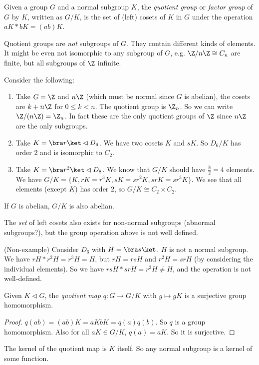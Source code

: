 \documentclass[a4pape]{article}
\begin{document}
\begin{defi}
  Given a group $G$ and a normal subgroup $K$, the \emph{quotient group} or \emph{factor group} of $G$ by $K$, written as $G/K$, is the set of (left) cosets of $K$ in $G$ under the operation $aK*bK = (ab)K$.
\end{defi}

\note Quotient groups are \emph{not} subgroups of $G$. They contain different kinds of elements. It might be even not isomorphic to any subgroup of $G$, e.g. $\Z/n\Z \cong C_n$ are finite, but all subgroups of $\Z$ infinite.

\begin{eg}
  Consider the following:
  \begin{enumerate}
  \item Take $G = \Z$ and $n\Z$ (which must be normal since $G$ is abelian), the cosets are $k + n\Z$ for $0 \leq k < n$. The quotient group is $\Z_n$. So we can write $\Z/(n\Z) = \Z_n$. In fact these are the only quotient groups of $\Z$ since $n\Z$ are the only subgroups.
  \item Take $K = \bra r\ket \lhd D_6$. We have two cosets $K$ and $sK$. So $D_6/K$ has order 2 and is isomorphic to $C_2$.
  \item Take $K = \bra r^2\ket \lhd D_8$. We know that $G/K$ should have $\frac{8}{2} = 4$ elements. We have $G/K = \{ K, rK = r^3 K, sK = sr^2K, srK = sr^3K\}$. We see that all elements (except $K$) has order $2$, so $G/K\cong C_2\times C_2$.
  \end{enumerate}
\end{eg}
\note If $G$ is abelian, $G/K$ is also abelian.

\note The \emph{set} of left cosets also exists for non-normal subgroups (abnormal subgroups?), but the group operation above is not well defined.

\begin{eg}
  (Non-example) Consider $D_6$ with $H = \bra s\ket$. $H$ is not a normal subgroup. We have $rH * r^2 H = r^3 H = H$, but $rH = rsH$ and $r^2H = srH$ (by considering the individual elements). So we have $rsH * srH = r^2 H\not= H$, and the operation is not well-defined.
\end{eg}

\begin{lemma}
  Given $K\lhd G$, the \emph{quotient map} $q: G\rightarrow G/K$ with $g\mapsto gK$ is a surjective group homomorphism.
\end{lemma}

\begin{proof}
  $q(ab) = (ab)K = aKbK = q(a)q(b)$. So $q$ is a group homomorphism. Also for all $aK \in G/K$, $q(a) = aK$. So it is surjective. 
\end{proof}
\note The kernel of the quotient map is $K$ itself. So any normal subgroup is a kernel of some function.
\end{document}
